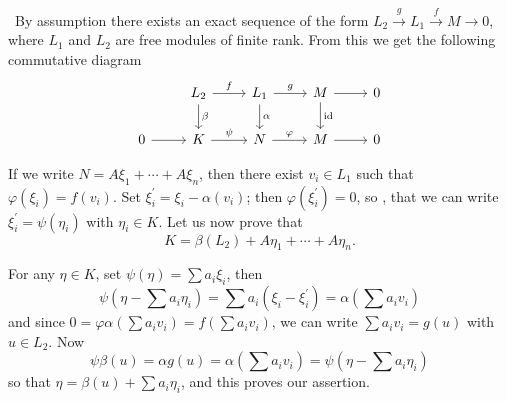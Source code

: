 \documentclass[a4paper,12pt]{article}
\newenvironment{prooff}{{\noindent\it\textcolor{cyan!40!black}{Proof}:}\,}{\par}
\theoremstyle{definition}
\begin{document}
\begin{prooff}
    By assumption there exists an exact sequence of the form $L_2 \xrightarrow{g} L_1 \xrightarrow{f} M \rightarrow 0$, where $L_1$ and $L_2$ are free modules of finite rank. From this we get the following commutative diagram
    \[\begin{tikzcd}
            & {L_2} & {L_1} & M & 0 \\
            0 & K & N & M & 0
            \arrow["f", from=1-2, to=1-3]
            \arrow["g", from=1-3, to=1-4]
            \arrow[from=1-4, to=1-5]
            \arrow["{\text{id}}", from=1-4, to=2-4]
            \arrow[from=2-4, to=2-5]
            \arrow["\varphi", from=2-3, to=2-4]
            \arrow["\psi", from=2-2, to=2-3]
            \arrow[from=2-1, to=2-2]
            \arrow["\beta", from=1-2, to=2-2]
            \arrow["\alpha", from=1-3, to=2-3]
        \end{tikzcd}\]

    If we write $N=A \xi_1+\cdots+A \xi_n$, then there exist $v_i \in L_1$ such that $\varphi\left(\xi_i\right)=f\left(v_i\right)$. Set $\xi_i^{\prime}=\xi_i-\alpha\left(v_i\right)$; then $\varphi\left(\xi_i^{\prime}\right)=0$, so , that we can write $\xi_i^{\prime}=\psi\left(\eta_i\right)$ with $\eta_i \in K$. Let us now prove that
    $$
        K=\beta\left(L_2\right)+A \eta_1+\cdots+A \eta_n .
    $$

    For any $\eta \in K$, set $\psi(\eta)=\sum a_i \xi_i$, then
    $$
        \psi\left(\eta-\sum a_i \eta_i\right)=\sum a_i\left(\xi_i-\xi_i^{\prime}\right)=\alpha\left(\sum a_i v_i\right)
    $$
    and since $0=\varphi \alpha\left(\sum a_i v_i\right)=f\left(\sum a_i v_i\right)$, we can write $\sum a_i v_i=g(u)$ with $u \in L_2$. Now
    $$
        \psi \beta(u)=\alpha g(u)=\alpha\left(\sum a_i v_i\right)=\psi\left(\eta-\sum a_i \eta_i\right)
    $$
    so that $\eta=\beta(u)+\sum a_i \eta_i$, and this proves our assertion.
\end{prooff}
\end{document}
